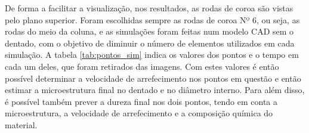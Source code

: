 De forma a facilitar a visualização, nos resultados, as rodas de coroa são vistas pelo plano superior. Foram escolhidas sempre as rodas de coroa Nº 6, ou seja, as rodas do meio da coluna, e as simulações foram feitas num modelo CAD sem o dentado, com o objetivo de diminuir o número de elementos utilizados em cada simulação. A tabela \ref{tab:pontos_sim} indica os valores dos pontos e o tempo em cada um deles, que foram retirados das imagens. Com estes valores é então possível determinar a velocidade de arrefecimento nos pontos em questão e então estimar a microestrutura final no dentado e no diâmetro interno. Para além disso, é possível também prever a dureza final nos dois pontos, tendo em conta a microestrutura, a velocidade de arrefecimento e a composição química do material.
